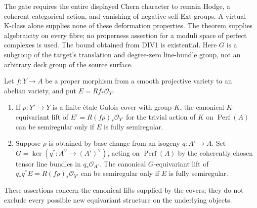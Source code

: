 The gate requires the entire displayed Chern character to remain
Hodge, a coherent categorical action, and vanishing of negative
self-Ext groups. A virtual K-class alone supplies none of these
deformation properties. The theorem supplies algebraicity on
every fibre; no properness assertion for a moduli space of
perfect complexes is used. The bound obtained from DIV1 is
existential. Here $G$ is a subgroup of the target's translation
and degree-zero line-bundle group, not an arbitrary deck group
of the source surface.

\begin{proposition}
\label{prop:semireg-cover-equivariance}
Let $f:Y\to A$ be a proper morphism from a smooth projective
variety to an abelian variety, and put $E=Rf_*\mathcal O_Y$.
\begin{enumerate}
\item If $\rho:Y'\to Y$ is a finite \'etale Galois cover with
group $K$, the canonical $K$-equivariant lift of
$E'=R(f\rho)_*\mathcal O_{Y'}$ for the trivial action of $K$
on $\operatorname{Perf}(A)$ can be semiregular only if $E$
is fully semiregular.
\item Suppose $\rho$ is obtained by base change from an isogeny
$q:A'\to A$. Set
$G=\ker(q^*:A^\vee\to(A')^\vee)$, acting on
$\operatorname{Perf}(A)$ by the coherently chosen tensor
line bundles in $q_*\mathcal O_{A'}$.
The canonical $G$-equivariant lift of
$q_*q^*E=R(f\rho)_*\mathcal O_{Y'}$ can be semiregular only if
$E$ is fully semiregular.
\end{enumerate}
These assertions concern the canonical lifts supplied by the
covers; they do not exclude every possible new equivariant
structure on the underlying objects.
\end{proposition}
